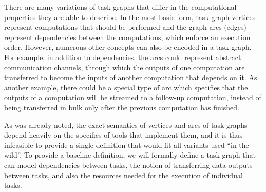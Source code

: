 There are many variations of task graphs that differ in the computational properties they are able
to describe. In the most basic form, task graph vertices represent computations that should be
performed and the graph arcs (edges) represent dependencies between the computations, which enforce
an execution order. However, numerous other concepts can also be encoded in a task graph. For
example, in addition to dependencies, the arcs could represent abstract communication channels,
through which the outputs of one computation are transferred to become the inputs of another
computation that depends on it. As another example, there could be a special type of arc which
specifies that the outputs of a computation will be streamed to a follow-up computation, instead of
being transferred in bulk only after the previous computation has finished.

As was already noted, the exact semantics of vertices and arcs of task graphs depend heavily on the
specifics of tools that implement them, and it is thus infeasible to provide a single definition
that would fit all variants used ``in the wild''. To provide a baseline definition, we will
formally define a task graph that can model dependencies between tasks, the notion of transferring
data outputs between tasks, and also the resources needed for the execution of individual tasks.

\newcommand{\alltaskpairs}{\forall t_1\in{}T, \forall t_2\in{}T}

